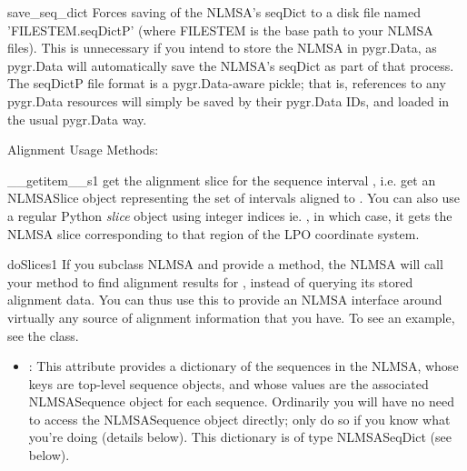 \documentclass{howto}
\begin{document}
\begin{funcdesc}{save_seq_dict}{}
  Forces saving of the NLMSA's seqDict to a disk file named 'FILESTEM.seqDictP'
  (where FILESTEM is the base path to your NLMSA files).  This is unnecessary
  if you intend to store the NLMSA in pygr.Data, as pygr.Data will automatically
  save the NLMSA's seqDict as part of that process.  The seqDictP file format
  is a pygr.Data-aware pickle; that is, references to any pygr.Data resources
  will simply be saved by their pygr.Data IDs, and loaded in the usual
  pygr.Data way.
\end{funcdesc}



Alignment Usage Methods:

\begin{funcdesc}{__getitem__}{s1}
  get the alignment slice for the sequence interval ,
  i.e. get an NLMSASlice object representing the set of intervals aligned to .
  You can also use a regular Python {\em slice} object using integer indices
  ie. , in which case, it gets the NLMSA slice corresponding to that 
  region of the LPO coordinate system.
\end{funcdesc}

\begin{funcdesc}{doSlice}{s1}
  If you subclass NLMSA and provide a  method, the NLMSA will
  call your  method to find alignment results for ,
  instead of querying its stored alignment data.  You can thus use this 
  to provide an NLMSA interface around virtually any source of alignment information
  that you have.  To see an example, see the  class.  
\end{funcdesc}

\begin{itemize}
\item
{}: This attribute provides a dictionary of the sequences in
the NLMSA, whose keys are top-level sequence objects, and whose values are
the associated NLMSASequence object for each sequence.  Ordinarily you will have
no need to access the NLMSASequence object directly; only do so if you know what
you're doing (details below).  This dictionary is of type NLMSASeqDict (see below).

\end{itemize}
\end{document}
